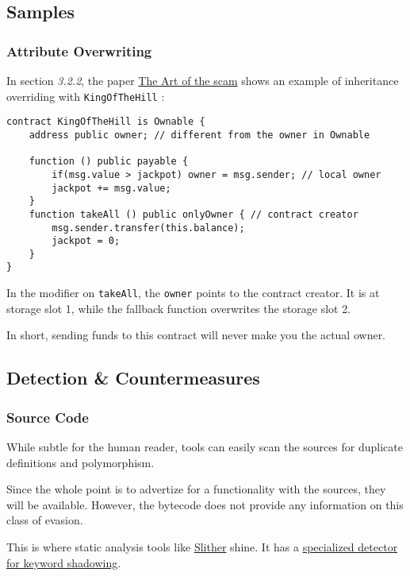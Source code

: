 \subsection{Samples}

\subsubsection{Attribute Overwriting}

In section \emph{3.2.2}, the paper \href{\urlpaperartofthescam}{The Art of the scam} shows an example of inheritance overriding with \lstinline{KingOfTheHill} :

\begin{lstlisting}[language=Solidity]
contract KingOfTheHill is Ownable {
    address public owner; // different from the owner in Ownable

    function () public payable {
        if(msg.value > jackpot) owner = msg.sender; // local owner
        jackpot += msg.value;
    }
    function takeAll () public onlyOwner { // contract creator
        msg.sender.transfer(this.balance);
        jackpot = 0;
    }
}
\end{lstlisting}

In the modifier on \lstinline{takeAll}, the \lstinline{owner} points to the contract creator.
It is at storage slot 1, while the fallback function overwrites the storage slot 2.

In short, sending funds to this contract will never make you the actual owner.

\subsection{Detection \& Countermeasures}

\subsubsection{Source Code}

While subtle for the human reader, tools can easily scan the sources for duplicate definitions and polymorphism.

Since the whole point is to advertize for a functionality with the sources, they will be available.
However, the bytecode does not provide any information on this class of evasion.

This is where static analysis tools like \href{\urlcodeslither}{Slither} shine.
It has a \href{\urlcodeslithervariableshadowing}{specialized detector for keyword shadowing}.
